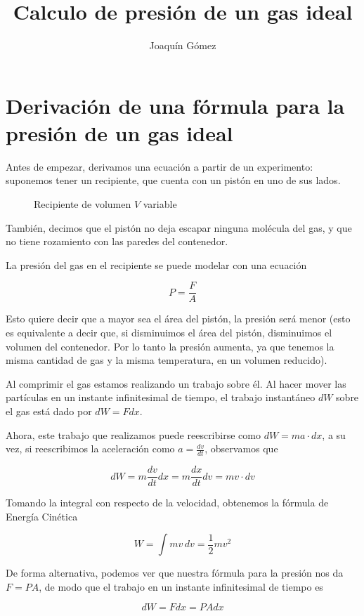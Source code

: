 \documentclass{article}
\title{Calculo de presión de un gas ideal}
\author{Joaquín Gómez}
\begin{document}
\maketitle

\section*{Derivación de una fórmula para la presión de un gas ideal}

Antes de empezar, derivamos una ecuación a partir de un experimento: suponemos
tener un recipiente, que cuenta con un pistón en uno de sus lados.

\begin{figure}[h]
  \centering
  \caption{Recipiente de volumen $V$ variable}
  
\end{figure}

También, decimos que el pistón no deja escapar ninguna molécula del gas, y que
no tiene rozamiento con las paredes del contenedor.

La presión del gas en el recipiente se puede modelar con una ecuación

\[
  P = \frac F A
\]

Esto quiere decir que a mayor sea el área del pistón, la presión será menor
(esto es equivalente a decir que, si disminuimos el área del pistón,
disminuimos el volumen del contenedor. Por lo tanto la presión aumenta, ya que
tenemos la misma cantidad de gas y la misma temperatura, en un volumen
reducido).

Al comprimir el gas estamos realizando un trabajo sobre él. Al hacer mover las
partículas en un instante infinitesimal de tiempo, el trabajo instantáneo $dW$
sobre el gas está dado por $dW=Fdx$.

Ahora, este trabajo que realizamos puede reescribirse como $dW=ma\cdot dx$, a
su vez, si reescribimos la aceleración como $a = \frac {dv}{dt}$, observamos
que

\[
  dW = m \frac{dv}{dt} dx = m \frac{dx}{dt}dv = mv \cdot dv
\]

Tomando la integral con respecto de la velocidad, obtenemos la fórmula de
Energía Cinética

\[
  W = \int {mv\,dv}= \frac 1 2 m v^2
\]

De forma alternativa, podemos ver que nuestra fórmula para la presión nos da
$F=PA$, de modo que el trabajo en un instante infinitesimal de tiempo es

\[
  dW=Fdx=PAdx
\]
\end{document}
